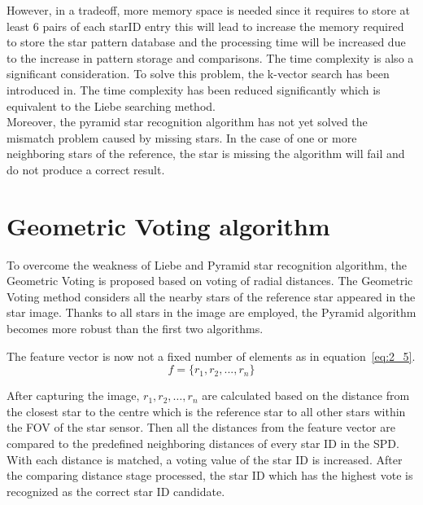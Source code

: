 \noindent However, in a tradeoff, more memory space is needed since it requires to store at least 6 pairs of each starID entry this will lead to increase the memory required to store the star pattern database and the processing time will be increased due to the increase in pattern storage and comparisons. The time complexity is also a significant consideration. To solve this problem, the k-vector search has been introduced in\cite{citation-241677739,citation-26584290}. The time complexity has been reduced significantly which is equivalent to the Liebe searching method. \\

\noindent Moreover, the pyramid star recognition algorithm has not yet solved the mismatch problem caused by missing stars. In the case of one or more neighboring stars of the reference, the star is missing the algorithm will fail and do not produce a correct result. \\

\section{Geometric Voting algorithm}

To overcome the weakness of Liebe and Pyramid star recognition algorithm, the Geometric Voting is proposed based on voting of radial distances\cite{edseee.456019820080101}. The Geometric Voting method considers all the nearby stars of the reference star appeared in the star image. Thanks to all stars in the image are employed, the Pyramid algorithm becomes more robust than the first two algorithms.


\noindent The feature vector is now not a fixed number of elements as in equation~\ref{eq:2_5}.
\begin{equation}
	f = \{r_1, r_2, ...,r_n\}
	\label{eq:2_5}
\end{equation}

\noindent After capturing the image, $r_1, r_2,…,r_n$ are calculated based on the distance from the closest star to the centre which is the reference star to all other stars within the FOV of the star sensor. Then all the distances from the feature vector are compared to the predefined neighboring distances of every star ID in the SPD. With each distance is matched, a voting value of the star ID is increased. After the comparing distance stage processed, the star ID which has the highest vote is recognized as the correct star ID candidate. \\


